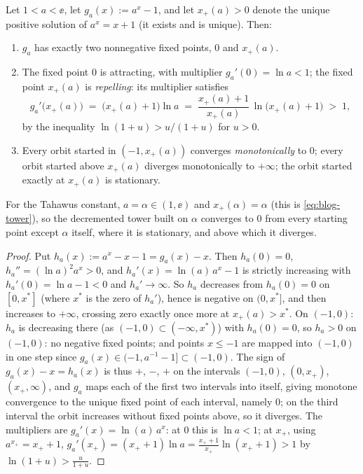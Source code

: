 \begin{theorem}\label{thm:tower}
Let $1 < a < \ee$, let $g_{a}(x) := a^{x} - 1$, and let $x_{+}(a) >
0$ denote the unique positive solution of $a^{x} = x + 1$ (it exists
and is unique). Then:
\begin{enumerate}[label=\textup{(\roman*)}, leftmargin=2.4em]
\item $g_{a}$ has exactly two nonnegative fixed points, $0$ and
$x_{+}(a)$.
\item The fixed point $0$ is attracting, with multiplier
$g_{a}'(0) = \ln a < 1$; the fixed point $x_{+}(a)$ is
\emph{repelling}: its multiplier satisfies
\begin{equation}\label{eq:repelling}
    g_{a}'\bigl(x_{+}(a)\bigr) \;=\; \bigl(x_{+}(a) + 1\bigr)\ln a
    \;=\; \frac{x_{+}(a) + 1}{x_{+}(a)}\,\ln\!\bigl(x_{+}(a)+1\bigr)
    \;>\; 1 ,
\end{equation}
by the inequality $\ln(1+u) > u/(1+u)$ for $u > 0$.
\item Every orbit started in $(-1, x_{+}(a))$ converges
\emph{monotonically} to $0$; every orbit started above
$x_{+}(a)$ diverges monotonically to $+\infty$; the orbit started
exactly at $x_{+}(a)$ is stationary.
\end{enumerate}
For the Tahawus constant, $a = \alpha \in (1, \ee)$ and
$x_{+}(\alpha) = \alpha$ (this is \eqref{eq:blog-tower}), so the
decremented tower built on $\alpha$ converges to $0$ from every
starting point except $\alpha$ itself, where it is stationary, and
above which it diverges.
\end{theorem}

\begin{proof}
Put $h_{a}(x) := a^{x} - x - 1 = g_{a}(x) - x$. Then
$h_{a}(0) = 0$, $h_{a}'' = (\ln a)^{2} a^{x} > 0$, and
$h_{a}'(x) = \ln(a)\,a^{x} - 1$ is strictly increasing with
$h_{a}'(0) = \ln a - 1 < 0$ and $h_{a}' \to \infty$. So $h_a$
decreases from $h_{a}(0) = 0$ on $[0, x^{*}]$ (where $x^{*}$ is the
zero of $h_{a}'$), hence is negative on $(0, x^{*}]$, and then
increases to $+\infty$, crossing zero exactly once more at
$x_{+}(a) > x^{*}$. On $(-1, 0)$: $h_{a}$ is decreasing there (as
$(-1,0) \subset (-\infty, x^{*})$) with $h_{a}(0) = 0$, so
$h_{a} > 0$ on $(-1, 0)$: no negative fixed points; and points
$x \le -1$ are mapped into $(-1, 0)$ in one step since
$g_{a}(x) \in (-1, a^{-1} - 1] \subset (-1, 0)$. The sign of
$g_{a}(x) - x = h_{a}(x)$ is thus $+$, $-$, $+$ on the intervals
$(-1,0)$, $(0, x_{+})$, $(x_{+}, \infty)$, and $g_{a}$ maps each of
the first two intervals into itself, giving monotone convergence to
the unique fixed point of each interval, namely $0$; on the third
interval the orbit increases without fixed points above, so it
diverges. The multipliers are $g_{a}'(x) = \ln(a)\,a^{x}$: at $0$
this is $\ln a < 1$; at $x_{+}$, using $a^{x_{+}} = x_{+}+1$,
$g_{a}'(x_{+}) = (x_{+}+1)\ln a = \frac{x_{+}+1}{x_{+}}
\ln(x_{+}+1) > 1$ by $\ln(1+u) > \frac{u}{1+u}$.
\end{proof}

